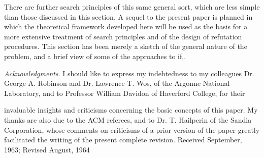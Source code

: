\documentclass[8pt]{extarticle}
\begin{document}
There are further search principles of this same general sort, which are less simple than those discussed in this section. A sequel to the present paper is planned in which the theoretical framework developed here will be used as the basis for a more extensive treatment of search principles and of the design of refutation procedures. This section has been merely a sketch of the general nature of the problem, and a brief view of some of the approaches to if,.

\emph{Acknowledgments}. I should like to express my indebtedness to my colleagues Dr. George A. Robinson and Dr. Lawrence T. Wos, of the Argonne National Laboratory, and to Professor William Davidon of Haverford College, for their

\newpage
invaluable insights and criticisms concerning the basic concepts of this paper. My thanks are also due to the ACM referees, and to Dr. T. Hailperin of the Sandia Corporation, whose comments on criticisms of a prior version of the paper greatly facilitated the writing of the present complete revision.
\noindent
Received September, 1963; Revised August, 1964


\end{document}
